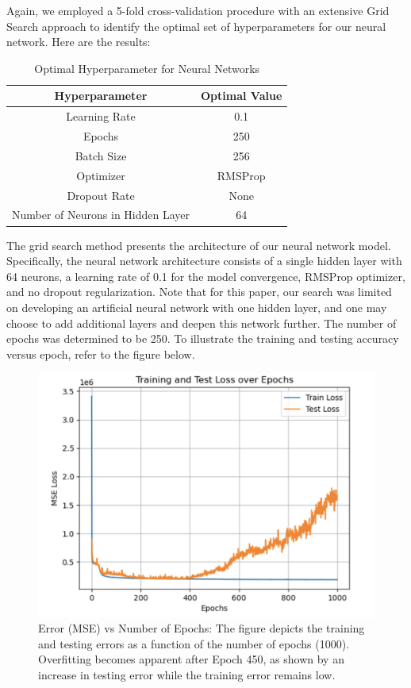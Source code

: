 \documentclass[conference]{IEEEtran}
\begin{document}
Again, we employed a 5-fold cross-validation procedure with an extensive Grid Search approach to identify the optimal set of hyperparameters for our neural network. Here are the results:

\begin{table}[H]
\centering
\caption{Optimal Hyperparameter for Neural Networks}
\begin{tabular}{|c|c|}
\hline
Hyperparameter & Optimal Value \\
\hline
Learning Rate & 0.1 \\
\hline
Epochs & 250 \\
\hline
Batch Size & 256 \\
\hline
Optimizer & RMSProp \\
\hline
Dropout Rate & None \\
\hline
Number of Neurons in Hidden Layer & 64 \\
\hline
\end{tabular}
\label{tab:nn_hyper}
\end{table}

The grid search method presents the architecture of our neural network model. Specifically, the neural network architecture consists of a single hidden layer with 64 neurons, a learning rate of 0.1 for the model convergence, RMSProp optimizer, and no dropout regularization. Note that for this paper, our search was limited on developing an artificial neural network with one hidden layer, and one may choose to add additional layers and deepen this network further. The number of epochs was determined to be 250. To illustrate the training and testing accuracy versus epoch, refer to the figure below.

\begin{figure}[H]
    \centering
    \includegraphics[width=1\linewidth]{1000.png} %
    \caption{Error (MSE) vs Number of Epochs: The figure depicts the training and testing errors as a function of the number of epochs (1000). Overfitting becomes apparent after Epoch 450, as shown by an increase in testing error while the training error remains low.}
    \label{fig:trn-tst-1000}
\end{figure}
\end{document}
